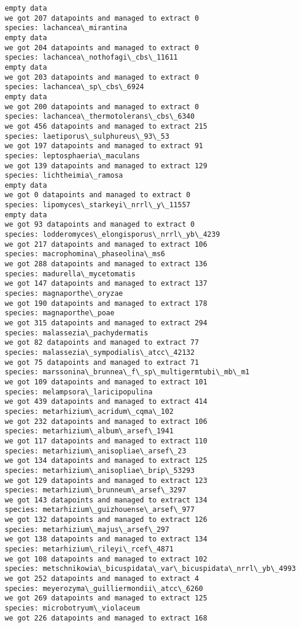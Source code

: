 \documentclass[11pt]{article}
\begin{document}
\begin{Verbatim}[commandchars=\\\{\}]
empty data
we got 207 datapoints and managed to extract 0
species: lachancea\_mirantina
empty data
we got 204 datapoints and managed to extract 0
species: lachancea\_nothofagi\_cbs\_11611
empty data
we got 203 datapoints and managed to extract 0
species: lachancea\_sp\_cbs\_6924
empty data
we got 200 datapoints and managed to extract 0
species: lachancea\_thermotolerans\_cbs\_6340
we got 456 datapoints and managed to extract 215
species: laetiporus\_sulphureus\_93\_53
we got 197 datapoints and managed to extract 91
species: leptosphaeria\_maculans
we got 139 datapoints and managed to extract 129
species: lichtheimia\_ramosa
empty data
we got 0 datapoints and managed to extract 0
species: lipomyces\_starkeyi\_nrrl\_y\_11557
empty data
we got 93 datapoints and managed to extract 0
species: lodderomyces\_elongisporus\_nrrl\_yb\_4239
we got 217 datapoints and managed to extract 106
species: macrophomina\_phaseolina\_ms6
we got 288 datapoints and managed to extract 136
species: madurella\_mycetomatis
we got 147 datapoints and managed to extract 137
species: magnaporthe\_oryzae
we got 190 datapoints and managed to extract 178
species: magnaporthe\_poae
we got 315 datapoints and managed to extract 294
species: malassezia\_pachydermatis
we got 82 datapoints and managed to extract 77
species: malassezia\_sympodialis\_atcc\_42132
we got 75 datapoints and managed to extract 71
species: marssonina\_brunnea\_f\_sp\_multigermtubi\_mb\_m1
we got 109 datapoints and managed to extract 101
species: melampsora\_laricipopulina
we got 439 datapoints and managed to extract 414
species: metarhizium\_acridum\_cqma\_102
we got 232 datapoints and managed to extract 106
species: metarhizium\_album\_arsef\_1941
we got 117 datapoints and managed to extract 110
species: metarhizium\_anisopliae\_arsef\_23
we got 134 datapoints and managed to extract 125
species: metarhizium\_anisopliae\_brip\_53293
we got 129 datapoints and managed to extract 123
species: metarhizium\_brunneum\_arsef\_3297
we got 143 datapoints and managed to extract 134
species: metarhizium\_guizhouense\_arsef\_977
we got 132 datapoints and managed to extract 126
species: metarhizium\_majus\_arsef\_297
we got 138 datapoints and managed to extract 134
species: metarhizium\_rileyi\_rcef\_4871
we got 108 datapoints and managed to extract 102
species: metschnikowia\_bicuspidata\_var\_bicuspidata\_nrrl\_yb\_4993
we got 252 datapoints and managed to extract 4
species: meyerozyma\_guilliermondii\_atcc\_6260
we got 269 datapoints and managed to extract 125
species: microbotryum\_violaceum
we got 226 datapoints and managed to extract 168

\end{Verbatim}
\end{document}
